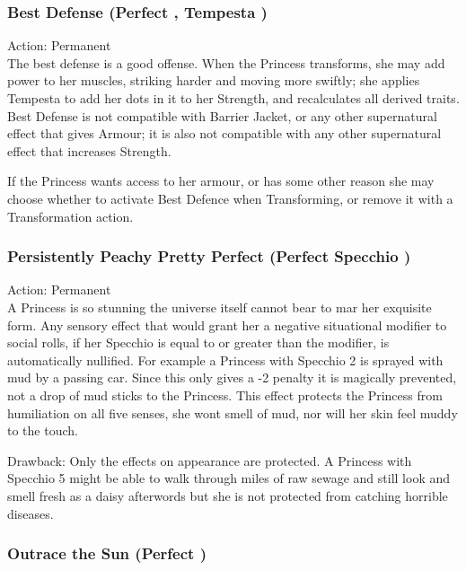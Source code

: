 \subsubsection*{Best Defense (Perfect \textbullet\textbullet, Tempesta \textbullet)}

\noindent Action: Permanent \\

\noindent The best defense is a good offense. When the Princess transforms, she may add power to her muscles, striking harder and moving more swiftly; she applies Tempesta to add her dots in it to her Strength, and recalculates all derived traits. Best Defense is not compatible with Barrier Jacket, or any other supernatural effect that gives Armour; it is also not compatible with any other supernatural effect that increases Strength.

If the Princess wants access to her armour, or has some other reason she may choose whether to activate Best Defence when Transforming, or remove it with a Transformation action.

\subsubsection*{Persistently Peachy Pretty Perfect (Perfect \textbullet\textbullet Specchio \textbullet)}

\noindent Action: Permanent \\

\noindent A Princess is so stunning the universe itself cannot bear to mar her exquisite form. Any sensory effect that would grant her a negative situational modifier to social rolls, if her Specchio is equal to or greater than the modifier, is automatically nullified. For example a Princess with Specchio 2 is sprayed with mud by a passing car. Since this only gives a -2 penalty it is magically prevented, not a drop of mud sticks to the Princess. This effect protects the Princess from humiliation on all five senses, she wont smell of mud, nor will her skin feel muddy to the touch.

Drawback: Only the effects on appearance are protected. A Princess with Specchio 5 might be able to walk through miles of raw sewage and still look and smell fresh as a daisy afterwords but she is not protected from catching horrible diseases.
\subsubsection*{Outrace the Sun (Perfect \textbullet\textbullet\textbullet)}

